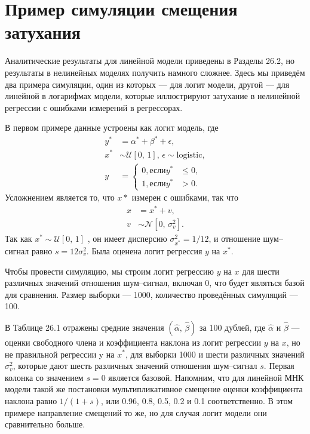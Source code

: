 \section{Пример симуляции смещения затухания} 
Аналитические результаты для линейной модели приведены в Разделы 26.2, но результаты в нелинейных моделях получить намного сложнее. Здесь мы приведём два примера симуляции, один из которых --- для логит модели, другой --- для линейной в логарифмах модели, которые иллюстрируют затухание в нелинейной регрессии с ошибками измерений в регрессорах.

В первом примере данные устроены как логит модель, где
\begin{align*}
y^* &=\alpha^* + \beta^* + \epsilon, \\
x^* &\sim \mathcal{U}[0, \, 1], \, \epsilon \sim \text{logistic}, \\
y &= 
\begin{cases}
0, \text{если} y^* &\leqslant0 ,\\
1, \text{если} y^* &>0.
\end{cases}
\end{align*}
Усложнением является то, что $x*$ измерен с ошибками, так что
\begin{align*}
x &=x^*+v, \\
v &\sim \mathcal{N}[0, \, \sigma^2_v].
\end{align*}
Так как $x^* \sim \mathcal{U}[0, \, 1]$ , он имеет дисперсию $\sigma^2_{x^*}=1/12$, и отношение шум--сигнал равно $s=12\sigma^2_v$. Была оценена логит регрессия $y$ на $x^*$.

Чтобы провести симуляцию, мы строим логит регрессию $y$ на $x$ для шести различных значений отношения шум--сигнал, включая 0, что будет являться базой для сравнения. Размер выборки --- 1000, количество проведённых симуляций --- 100. 

В Таблице 26.1 отражены средние значения $(\widehat{\alpha}, \, \widehat{\beta})$ за 100 дублей, где $\widehat{\alpha}$ и $\widehat{\beta}$ --- оценки свободного члена и коэффициента наклона из логит регрессии $y$ на $x$, но не правильной регрессии y на $x^*$, для выборки 1000 и шести различных значений $\sigma^2_v$, которые дают шесть различных значений отношения шум--сигнал $s$. Первая колонка со значением $s=0$ является базовой. Напомним, что для линейной МНК модели такой же постановки  мультипликативное смещение оценки коэффициента наклона равно $1/(1+s)$, или 0.96, 0.8, 0.5, 0.2 и 0.1 соответственно. В этом примере  направление смещений то же, но для случая логит модели они сравнительно больше.

